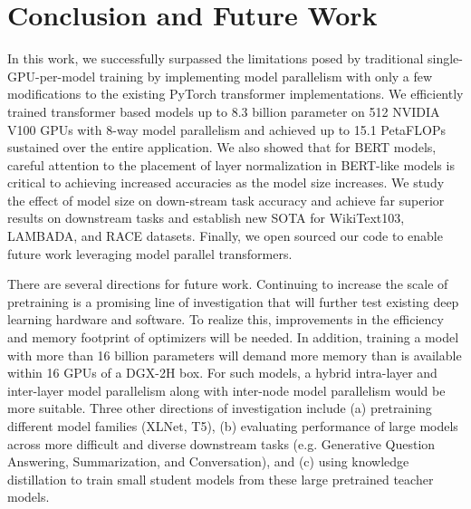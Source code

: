 \section{Conclusion and Future Work}

In this work, we successfully surpassed the limitations posed by traditional single-GPU-per-model training by implementing model parallelism with only a few modifications to the existing PyTorch transformer implementations. We efficiently trained transformer based models up to 8.3 billion parameter on 512 NVIDIA V100 GPUs with 8-way model parallelism and achieved up to 15.1 PetaFLOPs sustained over the entire application. We also showed that for BERT models, careful attention to the placement of layer normalization in BERT-like models is critical to achieving increased accuracies as the model size increases. We study the effect of model size on down-stream task accuracy and achieve far superior results on downstream tasks and establish new SOTA for WikiText103, LAMBADA, and RACE datasets. Finally, we open sourced our code to enable future work leveraging model parallel transformers.

There are several directions for future work. Continuing to increase the scale of pretraining is a promising line of investigation that will further test existing deep learning hardware and software. To realize this, improvements in the efficiency and memory footprint of optimizers will be needed. In addition, training a model with more than 16 billion parameters will demand more memory than is available within 16 GPUs of a DGX-2H box. For such models, a hybrid intra-layer and inter-layer model parallelism along with inter-node model parallelism would be more suitable.
Three other directions of investigation include (a) pretraining different model families (XLNet, T5), (b) evaluating performance of large models across more difficult and diverse downstream tasks (e.g. Generative Question Answering, Summarization, and Conversation), and (c) using knowledge distillation to train small student models from these large pretrained teacher models.
